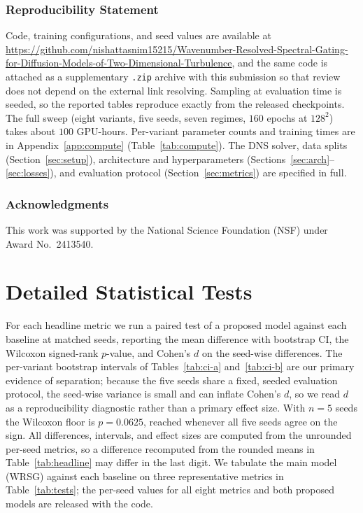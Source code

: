 \documentclass[10pt]{article} %
\def\coderepopublic{\url{https://github.com/nishattasnim15215/Wavenumber-Resolved-Spectral-Gating-for-Diffusion-Models-of-Two-Dimensional-Turbulence}}
\def\coderepo{\coderepopublic}
\begin{document}
\subsubsection*{Reproducibility Statement}

Code, training configurations, and seed values are available at \coderepo, and the same code is attached as a supplementary \texttt{.zip} archive with this submission so that review does not depend on the external link resolving. Sampling at evaluation time is seeded, so the reported tables reproduce exactly from the released checkpoints. The full sweep (eight variants, five seeds, seven regimes, $160$ epochs at $128^2$) takes about $100$ GPU-hours. Per-variant parameter counts and training times are in Appendix~\ref{app:compute} (Table~\ref{tab:compute}). The DNS solver, data splits (Section~\ref{sec:setup}), architecture and hyperparameters (Sections~\ref{sec:arch}--\ref{sec:losses}), and evaluation protocol (Section~\ref{sec:metrics}) are specified in full.

\subsubsection*{Acknowledgments}

This work was supported by the National Science Foundation (NSF) under Award No.~2413540.




\appendix

\section{Detailed Statistical Tests}
\label{app:tests}

For each headline metric we run a paired test of a proposed model against each baseline at matched seeds, reporting the mean difference with bootstrap CI, the Wilcoxon signed-rank $p$-value, and Cohen's $d$ \citep{cohen1988statistical} on the seed-wise differences. The per-variant bootstrap intervals of Tables~\ref{tab:ci-a} and~\ref{tab:ci-b} are our primary evidence of separation; because the five seeds share a fixed, seeded evaluation protocol, the seed-wise variance is small and can inflate Cohen's $d$, so we read $d$ as a reproducibility diagnostic rather than a primary effect size. With $n = 5$ seeds the Wilcoxon floor is $p = 0.0625$, reached whenever all five seeds agree on the sign. All differences, intervals, and effect sizes are computed from the unrounded per-seed metrics, so a difference recomputed from the rounded means in Table~\ref{tab:headline} may differ in the last digit. We tabulate the main model (WRSG) against each baseline on three representative metrics in Table~\ref{tab:tests}; the per-seed values for all eight metrics and both proposed models are released with the code.
\end{document}
